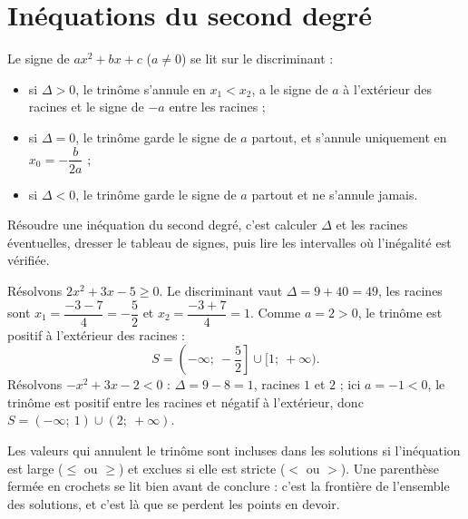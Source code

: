 \section{Inéquations du second degré}

\begin{propriete}
Le signe de $ax^{2} + bx + c$ ($a \neq 0$) se lit sur le discriminant :
\begin{itemize}
  \item si $\Delta > 0$, le trinôme s'annule en $x_{1} < x_{2}$, a le signe de $a$ à l'extérieur des racines et le signe de $-a$ entre les racines ;
  \item si $\Delta = 0$, le trinôme garde le signe de $a$ partout, et s'annule uniquement en $x_{0} = -\dfrac{b}{2a}$ ;
  \item si $\Delta < 0$, le trinôme garde le signe de $a$ partout et ne s'annule jamais.
\end{itemize}
Résoudre une inéquation du second degré, c'est calculer $\Delta$ et les racines éventuelles, dresser le tableau de signes, puis lire les intervalles où l'inégalité est vérifiée.
\end{propriete}

\begin{exemple}
Résolvons $2x^{2} + 3x - 5 \geqslant 0$. Le discriminant vaut $\Delta = 9 + 40 = 49$, les racines sont $x_{1} = \dfrac{-3 - 7}{4} = -\dfrac{5}{2}$ et $x_{2} = \dfrac{-3 + 7}{4} = 1$. Comme $a = 2 > 0$, le trinôme est positif à l'extérieur des racines :
\[
S = \left(-\infty;\ -\frac{5}{2}\right] \cup [1;\ +\infty).
\]
Résolvons $-x^{2} + 3x - 2 < 0$ : $\Delta = 9 - 8 = 1$, racines $1$ et $2$ ; ici $a = -1 < 0$, le trinôme est positif entre les racines et négatif à l'extérieur, donc $S = (-\infty;\ 1) \cup (2;\ +\infty)$.
\end{exemple}

\begin{attention}
Les valeurs qui annulent le trinôme sont incluses dans les solutions si l'inéquation est large ($\leqslant$ ou $\geqslant$) et exclues si elle est stricte ($<$ ou $>$). Une parenthèse fermée en crochets se lit bien avant de conclure : c'est la frontière de l'ensemble des solutions, et c'est là que se perdent les points en devoir.
\end{attention}

